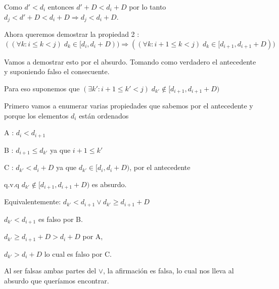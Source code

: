 Como $d' < d_i$ entonces $d'+D < d_i+D$ por lo tanto $d_j<d'+D<d_i+D \Rightarrow d_j<d_i+D$.

Ahora queremos demostrar la propiedad 2 : $((\forall k: i \leq k < j)\;d_k \in [d_i, d_i + D)) \Rightarrow ((\forall k: i + 1 \leq k < j)\;d_k \in [d_{i+1}, d_{i+1} + D))$

Vamos a demostrar esto por el absurdo. Tomando como verdadero el antecedente y suponiendo falso el consecuente.

Para eso suponemos que $(\exists k': i+1\leq k' < j) \;d_{k'} \notin [d_{i+1}, d_{i+1} + D) $

Primero vamos a enumerar varias propiedades que sabemos por el antecedente y porque los elementos $d_i$ están ordenados

A : $d_i < d_{i+1}$

B : $d_{i+1} \leq d_{k'}$ ya que $i+1 \leq k'$

C : $d_{k'} < d_i +D$ ya que $d_{k'} \in [d_i,d_i +D)$, por el antecedente

q.v.q $d_{k'} \notin [d_{i+1}, d_{i+1} + D)$ es absurdo.

Equivalentemente: $d_{k'} < d_{i+1} \vee d_{k'} \geq d_{i+1} + D $ 

$d_{k'} < d_{i+1}$ es falso por B.

$d_{k'} \geq d_{i+1} + D  > d_i + D$ por A,

$d_{k'} > d_i + D$ lo cual es falso por C.

Al ser falsas ambas partes del $\vee$, la afirmación es falsa, lo cual nos lleva al absurdo que queríamos encontrar.

